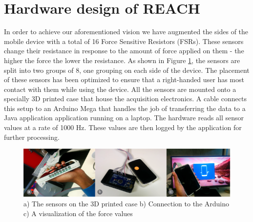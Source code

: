 \section{Hardware design of REACH}
In order to achieve our aforementioned vision we have augmented the sides of the mobile device with a total of 16 Force Sensitive Resistors (FSRs). These sensors change their resistance in response to the amount of force applied on them - the higher the force the lower the resistance. As shown in Figure \ref{fig:hardware_setup}, the sensors are split into two groups of 8, one grouping on each side of the device. The placement of these sensors has been optimized to ensure that a right-handed user has most contact with them while using the device. All the sensors are mounted onto a specially 3D printed case that house the acquisition electronics. A cable connects this setup to an Arduino Mega that handles the job of transferring the data to a Java application application running on a laptop. The hardware reads all sensor values at a rate of 1000 Hz. These values are then logged by the application for further processing.

\begin{figure}[h]
\includegraphics[width=.45\textwidth]{hardware_setup.png}
\caption{a) The sensors on the 3D printed case b) Connection to the Arduino c) A visualization of the force values}
\label{fig:hardware_setup}
\end{figure}
